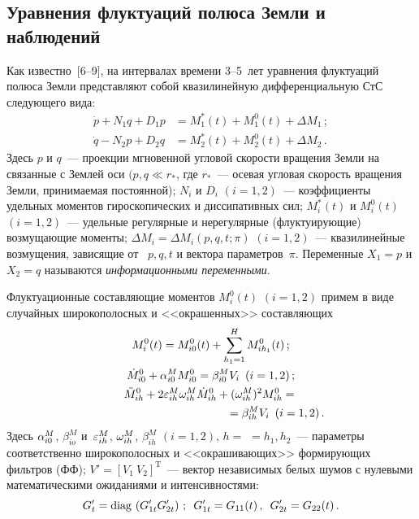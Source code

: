 \begin{multicols}{2}
\section{Уравнения флуктуаций полюса Земли и наблюдений}

Как известно~[6--9], на интервалах времени 3--5~лет уравнения флуктуаций полюса Земли пред\-став\-ля\-ют 
собой квазилинейную дифференциальную СтС следующего вида:
    \begin{align}
    \dot p + N_1 q + D_1 p &= M_1^* (t) + M_1^0(t) +\Delta M_1\,;\label{e1sin}\\
\dot q - N_2 p + D_2 q &= M_2^* (t) + M_2^0(t) +\Delta M_2\,.\label{e2sin}
\end{align}
Здесь $p$ и $q$~--- проекции мгновенной угловой ско\-рости вращения Земли на связанные с Землей
 оси $(p,q\ll r_*$, где $r_*$~--- осевая угловая скорость вращения Земли, принимаемая постоянной); 
 $N_i$ и  $D_i$ $(i=1,2)$~--- коэффициенты удельных моментов гироскопических и диссипативных сил;  
 $M_i^*(t)$ и $M_i^0(t)$ $(i=1,2)$~--- удельные регулярные и нерегулярные (флуктуирующие) возмущающие 
 моменты; $\Delta M_i=\Delta M_i (p,q,t;\pi)$ $(i=1,2)$~--- 
 квазилинейные возмущения, зависящие от~ $p,q,t$ и вектора па\-ра\-мет\-ров~$\pi$.
Переменные $X_1=p$ и $X_2 =q$  называются \textit{информационными переменными}.

Флуктуационные составляющие моментов  $M_i^0 (t)$ $(i=1,2)$ примем в виде случайных широкополосных 
и <<окрашенных>>  составляющих
\begin{gather}
M_i^0(t) = M_{i0}^0 (t) + \sum\limits_{h_1 =1}^H M_{ih_1}^0 (t)\,;\label{e3sin}\\
\dot M_{i0}^0 +\alp_{i0}^M M_{i0}^0 =\beta_{i0}^M V_i \enskip (i=1,2)\,;\label{e4sin}\\
\ddot M_{ih}^0 +2\eps_{ih}^M \w_{ih}^M \dot M_{ih}^0 +(\w_{ih}^M)^2 M_{ih}^0 ={}\notag\\
\hspace*{40mm}{}=\beta_{ih}^M V_i \enskip (i=1,2)\,.
\label{e5sin}
\end{gather}
Здесь $\alpha_{i0}^M$, $\beta_{io}^M$ и~$\varepsilon_{ih}^M$, $\omega_{ih}^M$, $\beta_{ih}^M$ $(i=1,2)$, $h=$\linebreak 
$=h_1, h_2$~--- 
параметры соответственно широкополосных и  <<окрашивающих>> формирующих фильтров (ФФ); $V' =[V_1\ V_2]^{\mathrm{T}}$~--- 
вектор независимых белых шумов с нулевыми математическими ожиданиями и интенсивностями:
$$
G_t' = \mathrm{diag}\, \left(G_{1t}' G_{2t}'\right)\,;\enskip G_{1t}' = G_{11}(t)\,,\enskip G_{2t}' = G_{22}(t)\,.
$$


\end{multicols}
